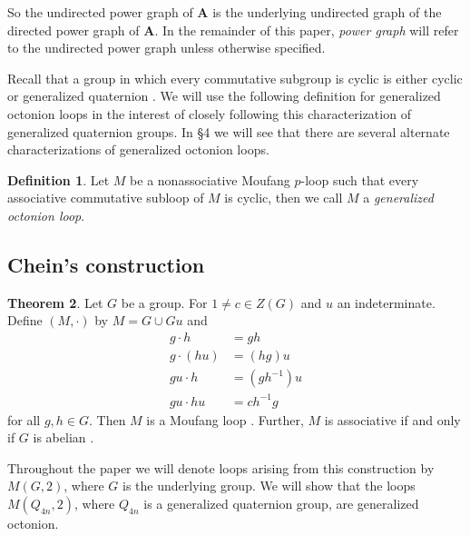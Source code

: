 \documentclass[12pt]{report}
\theoremstyle{definition}
\newtheorem{thm}{Theorem}[chapter]
\newtheorem{dfn}[thm]{Definition}
\begin{document}
So the undirected power graph of \textbf{A} is the underlying undirected graph of the directed power graph of
  \textbf{A}. In the remainder of this paper, \textit{power graph} will refer to the undirected power graph
  unless otherwise specified.

Recall that a group in which every commutative subgroup is cyclic is either cyclic or generalized quaternion
  \cite{Cartan}. We will use the following definition for generalized octonion loops in the interest of closely
  following this characterization of generalized quaternion groups. In {\S}4 we will see that there are several
  alternate characterizations of generalized octonion loops.

\begin{dfn}
	Let $M$ be a nonassociative Moufang $p$-loop such that every associative commutative subloop of $M$ is cyclic,
    then we call $M$ a \textit{generalized octonion loop}.
\end{dfn}

\subsection{Chein's construction}

\begin{thm}\label{cnst-chein}
  Let $G$ be a group. For $1\neq c\in Z(G)$ and $u$ an indeterminate. Define $(M, \cdot)$ by $M = G\cup Gu$ and
  \begin{align*}
    g\cdot h &= gh\\
    g\cdot (hu) &= (hg)u\\
    gu\cdot h &= (gh^{-1})u\\
    gu\cdot hu &= ch^{-1}g
  \end{align*}
  for all $g, h\in G$. Then $M$ is a Moufang loop \cite{Chein}. Further, $M$ is associative if and only if $G$
    is abelian \cite{Chein}.
\end{thm}

Throughout the paper we will denote loops arising from this construction by $M(G, 2)$, where $G$ is the underlying
  group. We will show that the loops $M(Q_{4n}, 2)$, where $Q_{4n}$ is
  a generalized quaternion group, are generalized octonion.
\end{document}
